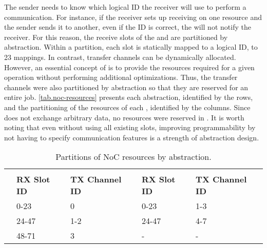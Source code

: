 			The sender needs to know which logical ID the receiver will use to perform
			a communication. For instance, if the receiver sets up receiving on one
			\dnoc resource and the sender sends it to another, even if the ID is correct,
			the \dma will not notify the receiver. For this reason, the receive slots
			of the \cnoc and \dnoc are  partitioned by abstraction. Within a
			partition, each slot is statically mapped to a logical ID,  to 23 mappings.
			In contrast, transfer channels can be dynamically allocated. However,
			an essential concept of \nanvixhal is to provide the resources required for
			a given operation without performing additional optimizations. Thus, the
			transfer channels were also partitioned by abstraction so that they are
			reserved for an entire job. \autoref{tab.noc-resources} presents each
			abstraction, identified by the rows, and the partitioning of the resources
			of each \noc, identified by the columns. Since \sync does not exchange
			arbitrary data, no resources were reserved in \dnoc. It is worth
			noting that even without using all existing slots, improving
			programmability by not having to specify communication features is a
			strength of abstraction design.

			\begin{table}[!tb]
				\centering%
				\caption{Partitions of NoC resources by abstraction.}%
				\label{tab.noc-resources}%

				\begin{tabular}{l|l|l|l|l|}
					\cline{2-5}
															& \multicolumn{2}{c|}{\textbf{\cnoc}}          & \multicolumn{2}{c|}{\textbf{\dnoc}}          \\ \cline{2-5}
															& \textbf{RX Slot ID} & \textbf{TX Channel ID} & \textbf{RX Slot ID} & \textbf{TX Channel ID} \\ \hline
					\multicolumn{1}{|l|}{\textbf{\mailbox}} & 0-23                & 0                      & 0-23                & 1-3                    \\ \hline
					\multicolumn{1}{|l|}{\textbf{\portal}}  & 24-47               & 1-2                    & 24-47               & 4-7                    \\ \hline
					\multicolumn{1}{|l|}{\textbf{\sync}}    & 48-71               & 3                      & -                   & -                      \\ \hline
				\end{tabular}

			\end{table}

